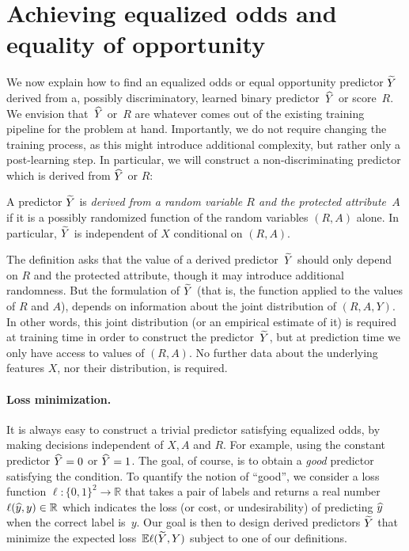 \section{Achieving equalized odds and equality of opportunity}
\label{sec:achieving}

We now explain how to find an equalized odds or equal opportunity
predictor $\widetilde{Y}$ derived from a, possibly discriminatory, learned
binary predictor~$\widehat{Y}$ or score~$R.$ We envision that~$\widehat{Y}$ or~$R$
are whatever comes out of the existing training pipeline for the
problem at hand.  Importantly, we do not require changing the training
process, as this might introduce additional complexity, but rather
only a post-learning step.  In particular, we will construct a non-discriminating predictor which is derived from $\widehat{Y}$ or $R$:

\begin{definition}
A predictor $\widetilde{Y}$ is \emph{derived from a random variable $R$ and the
protected attribute~$A$} if it is a possibly randomized function of the random
variables $(R, A)$ alone.  In particular, $\widetilde{Y}$ is independent of $X$
conditional on $(R, A).$
\end{definition}
%
The definition asks that the value of a derived predictor~$\widetilde{Y}$
should only depend on $R$ and the protected attribute, though it may
introduce additional randomness. But the formulation of $\widetilde{Y}$
(that is, the function applied to the values of $R$ and $A$), depends
on information about the joint distribution of $(R, A, Y).$ In other
words, this joint distribution (or an empirical estimate of it) is
required at training time in order to construct the
predictor~$\widetilde{Y}$, but at prediction time we only have access to
values of $(R, A)$.  No further data about the underlying features
$X$, nor their distribution, is required.
%
\paragraph{Loss minimization.}
It is always easy to construct a trivial predictor satisfying
equalized odds, by making decisions independent of $X,A$ and $R$.  For
example, using the constant predictor $\widehat{Y}=0$ or $\widehat{Y}=1$.  The
goal, of course, is to obtain a {\em good} predictor satisfying the
condition.  To quantify the notion of ``good'', we consider a loss
function $\ell\colon\{0,1\}^2\rightarrow\mathbb{R}$ that takes a pair
of labels and returns a real number $\ell(\widehat{y},y)\in\mathbb{R}$ which
indicates the loss (or cost, or undesirability) of predicting $\widehat{y}$
when the correct label is~$y.$ Our goal is then to design derived
predictors $\widetilde{Y}$ that minimize the expected loss~$\mathbb{E}\ell(\widetilde{Y},
Y)$ subject to one of our definitions.

